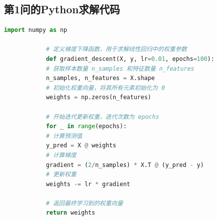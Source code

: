\documentclass{JYU} %
\begin{document}
	\clearpage
	
	
	\newpage
	\begin{appendices}
		\renewcommand{\thesection}{附录\Alph{section}}
		\section{第1问的Python求解代码}
		
		\label{append_python}
		
		\begin{lstlisting}[language=Python]
			import numpy as np
			
			# 定义梯度下降函数，用于求解线性回归中的权重参数
			def gradient_descent(X, y, lr=0.01, epochs=100):
			# 获取样本数量 n_samples 和特征数量 n_features
			n_samples, n_features = X.shape
			# 初始化权重向量，将其所有元素初始化为 0
			weights = np.zeros(n_features)
			
			# 开始迭代更新权重，迭代次数为 epochs
			for _ in range(epochs):
			# 计算预测值
			y_pred = X @ weights
			# 计算梯度
			gradient = (2/n_samples) * X.T @ (y_pred - y)
			# 更新权重
			weights -= lr * gradient
			
			# 返回最终学习到的权重向量
			return weights
		\end{lstlisting}
		
	\end{appendices}
\end{document}
